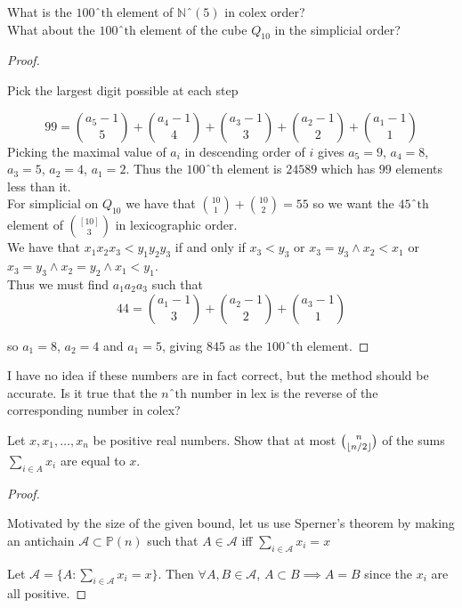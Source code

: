 \documentclass[a4paper]{article}
\renewcommand{\P}{\mathbb{P}}
\renewcommand{\A}{\mathcal{A}}
\begin{document}
\begin{question}[Question 10]
  What is the $100ˆ{\text{th}}$ element of $\mathbb{N}ˆ{(5)}$ in colex order?\\

  What about the $100ˆ{\text{th}}$ element of the cube $Q_{10}$ in the
  simplicial order?
\end{question}
\begin{proof}
  \begin{idea}
    Pick the largest digit possible at each step
  \end{idea}
  \[99 = \binom{a_5 - 1}{5} + \binom{a_4 - 1}{4} + \binom{a_3 - 1}{3} +
    \binom{a_2 - 1}{2} + \binom{a_1 - 1}{1}\]
  Picking the maximal value of $a_i$ in descending order of $i$ gives $a_5 = 9$,
  $a_4 = 8$, $a_3 = 5$, $a_2 = 4$, $a_1 = 2$. Thus the $100ˆ{\text{th}}$ element
  is $24589$ which has $99$ elements less than it.\\


  For simplicial on $Q_{10}$ we have that $\binom{10}{1} + \binom{10}{2} = 55$
  so we want the $45ˆ{\text{th}}$ element of $\binom{[10]}{3}$ in lexicographic
  order.\\
  We have that $x_1 x_2 x_3 < y_1 y_2 y_3$ if and only if $x_3 <
  y_3$ or $x_3 = y_3 \land x_2 < x_1$ or $x_3 = y_3 \land x_2 = y_2 \land x_1 <
  y_1$.\\
  Thus we must find $a_1 a_2 a_3$ such that
  \[44 = \binom{a_1 - 1}{3} + \binom{a_2 - 1}{2} + \binom{a_3 - 1}{1}\]

  so $a_1 = 8$, $a_2 = 4$ and $a_1 = 5$, giving $845$ as the $100ˆ{\text{th}}$ element.
\end{proof}
\begin{remark}
  I have no idea if these numbers are in fact correct, but the method should be
  accurate. Is it true that the $nˆ{\text{th}}$ number in lex is the reverse of
  the corresponding number in colex?
\end{remark}

\begin{question}[Question 11]
  Let $x, x_1, \dots ,x_n$ be positive real numbers. Show that at most
  $\binom{n}{\lfloor n/2\rfloor}$ of the sums $\sum_{i \in A}x_i$ are equal to $x$.
\end{question}
\begin{proof}
  \begin{idea}
    Motivated by the size of the given bound, let us use Sperner's theorem by making an antichain $\A \subset \P(n)$ such that
    $A \in \A$ iff $\sum_{i \in \A} x_i = x$
  \end{idea}
  Let $\A = \{A : \sum_{i \in \A}x_i = x\}$. Then $\forall A, B \in \A$, $A
  \subset B \implies A = B$ since the $x_i$ are all positive.
\end{proof}
\end{document}
